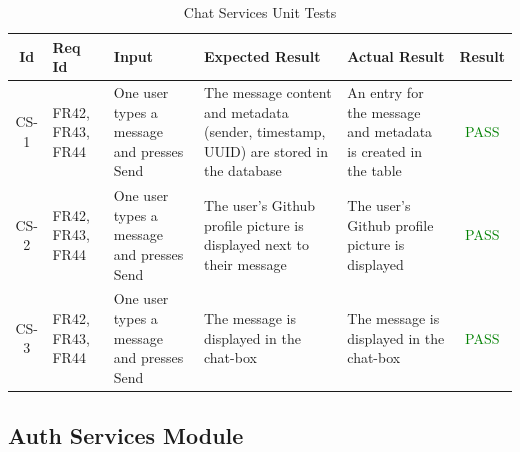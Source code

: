 \documentclass[12pt, titlepage]{article}
\begin{document}
\begin{center}
    \begin{longtable}{|c|p{1cm}|p{2.7cm}|p{3cm}|p{3cm}|c|}
        \caption{Chat Services Unit Tests \label{long}}\\
        \hline
        \textbf{Id} & \textbf{Req Id} & \textbf{Input} & \textbf{Expected Result} & \textbf{Actual Result} & \textbf{Result}   \\
        \hline
        CS-1 & FR42, FR43, FR44 & One user types a message and presses Send & The message content and metadata (sender, timestamp, UUID) are stored in the database & An entry for the message and metadata is created in the table  &  \textcolor{green}{PASS} \\
        \hline
        CS-2 & FR42, FR43, FR44 & One user types a message and presses Send & The user's Github profile picture is displayed next to their message & The user's Github profile picture is displayed &  \textcolor{green}{PASS} \\
        \hline
        CS-3 & FR42, FR43, FR44 & One user types a message and presses Send &  The message is displayed in the chat-box & The message is displayed in the chat-box &  \textcolor{green}{PASS} \\
        \hline
    \end{longtable}
\end{center}

\subsection{Auth Services Module}
\end{document}
